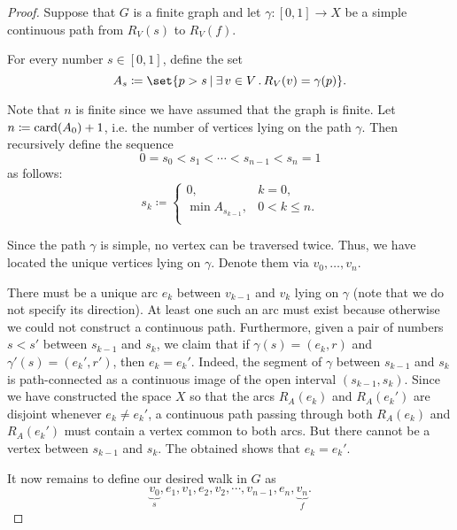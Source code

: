 \begin{proof}
   Suppose that \( G \) is a finite graph and let \( \gamma: [0, 1] \to X \) be a simple continuous path from \( R_V(s) \) to \( R_V(f) \).

  For every number \( s \in [0, 1] \), define the set
  \begin{equation*}
    A_s \coloneqq \set{ p > s \given \qexists {v \in V} R_V(v) = \gamma(p) }.
  \end{equation*}

  Note that \( n \) is finite since we have assumed that the graph is finite. Let \( n \coloneqq \operatorname{card}(A_0) + 1 \), i.e. the number of vertices lying on the path \( \gamma \). Then recursively define the sequence
  \begin{equation*}
    0 = s_0 < s_1 < \cdots < s_{n-1} < s_n = 1
  \end{equation*}
  as follows:
  \begin{equation*}
    s_k \coloneqq \begin{cases}
      0,                &k = 0, \\
      \min A_{s_{k-1}}, &0 < k \leq n. \\
    \end{cases}
  \end{equation*}

  Since the path \( \gamma \) is simple, no vertex can be traversed twice. Thus, we have located the unique vertices lying on \( \gamma \). Denote them via \( v_0, \ldots, v_n \).

  There must be a unique arc \( e_k \) between \( v_{k-1} \) and \( v_k \) lying on \( \gamma \) (note that we do not specify its direction). At least one such an arc must exist because otherwise we could not construct a continuous path. Furthermore, given a pair of numbers \( s < s' \) between \( s_{k-1} \) and \( s_k \), we claim that if \( \gamma(s) = (e_k, r) \) and \( \gamma'(s) = (e_k', r') \), then \( e_k = e_k' \). Indeed, the segment of \( \gamma \) between \( s_{k-1} \) and \( s_k \) is path-connected as a continuous image of the open interval \( (s_{k-1}, s_k) \). Since we have constructed the space \( X \) so that the arcs \( R_A(e_k) \) and \( R_A(e_k') \) are disjoint whenever \( e_k \neq e_k' \), a continuous path passing through both \( R_A(e_k) \) and \( R_A(e_k') \) must contain a vertex common to both arcs. But there cannot be a vertex between \( s_{k-1} \) and \( s_k \). The obtained shows that \( e_k = e_k' \).

  It now remains to define our desired walk in \( G \) as
  \begin{equation*}
    \underbrace{v_0}_s, e_1, v_1, e_2, v_2, \cdots, v_{n-1}, e_n, \underbrace{v_n}_f.
  \end{equation*}
\end{proof}

